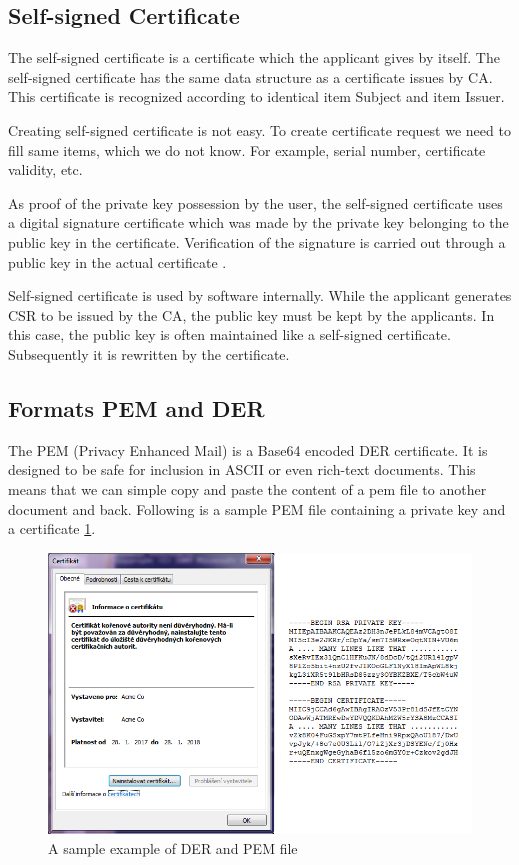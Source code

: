 \documentclass[
  digital, %
  notable,   %
  lof,     %
  lot,     %
]{fithesis3}
\begin{document}
\subsection{Self-signed Certificate}
The self-signed certificate is a certificate which the applicant gives by itself. The 
self-signed certificate has the same data structure as a certificate issues by CA. This 
certificate is recognized according to identical item Subject and item Issuer.

Creating self-signed certificate is not easy. To create certificate request we need to fill 
same items, which we do not know. For example, serial number, certificate validity, etc.

As proof of the private key possession by the user, the self-signed certificate uses a 
digital signature certificate which was made by the private key belonging to the public key 
in the certificate. Verification of the signature is carried out through a public key in the 
actual certificate \cite{dostalek2016velky}.

Self-signed certificate is used by software internally. While the applicant generates CSR to 
be issued by the CA, the public key must be kept by the applicants. In this case, the public 
key is often maintained like a self-signed certificate. Subsequently it is rewritten by the 
certificate.

\subsection{Formats PEM and DER}
The PEM (Privacy Enhanced Mail) is a Base64 encoded DER certificate. It is designed 
to be safe for inclusion in ASCII or even rich-text documents. This means that we can simple 
copy and paste the content of a pem file to another document and back. Following is a sample 
PEM file containing a private key and a certificate \ref{fig:vzorPEM-DER}.

\begin{figure}[th]
	\centering
	\includegraphics[width=1\textwidth]{pem-der}
	\caption{A sample example of DER and PEM file}
	\label{fig:vzorPEM-DER}
\end{figure}
\end{document}
